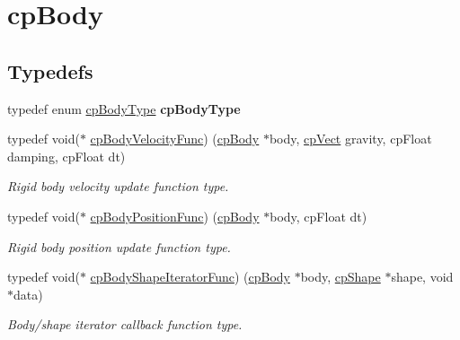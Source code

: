 \hypertarget{group__cpBody}{}\section{cp\+Body}
\label{group__cpBody}
\subsection*{Typedefs}
\begin{DoxyCompactItemize}
\item 
\mbox{\label{group__cpBody_ga45565578b1dfe055f40930f24506807a}} 
typedef enum \hyperlink{group__cpBody_ga3581b128fd3e2734952aeac8545fd5ca}{cp\+Body\+Type} {\bfseries cp\+Body\+Type}
\item 
\mbox{\label{group__cpBody_gaa7a1f4706fb8e879c356ae99035ead71}} 
typedef void($\ast$ \hyperlink{group__cpBody_gaa7a1f4706fb8e879c356ae99035ead71}{cp\+Body\+Velocity\+Func}) (\hyperlink{structcpBody}{cp\+Body} $\ast$body, \hyperlink{structcpVect}{cp\+Vect} gravity, cp\+Float damping, cp\+Float dt)
\begin{DoxyCompactList}\small\item\em Rigid body velocity update function type. \end{DoxyCompactList}\item 
\mbox{\label{group__cpBody_ga3386e3b0b4156289ab6099cc64c952e7}} 
typedef void($\ast$ \hyperlink{group__cpBody_ga3386e3b0b4156289ab6099cc64c952e7}{cp\+Body\+Position\+Func}) (\hyperlink{structcpBody}{cp\+Body} $\ast$body, cp\+Float dt)
\begin{DoxyCompactList}\small\item\em Rigid body position update function type. \end{DoxyCompactList}\item 
\mbox{\label{group__cpBody_gacc4f466cbeaa87fc8b05c0357e1e316d}} 
typedef void($\ast$ \hyperlink{group__cpBody_gacc4f466cbeaa87fc8b05c0357e1e316d}{cp\+Body\+Shape\+Iterator\+Func}) (\hyperlink{structcpBody}{cp\+Body} $\ast$body, \hyperlink{structcpShape}{cp\+Shape} $\ast$shape, void $\ast$data)
\begin{DoxyCompactList}\small\item\em Body/shape iterator callback function type. \end{DoxyCompactList}\item 

\end{DoxyCompactItemize}
